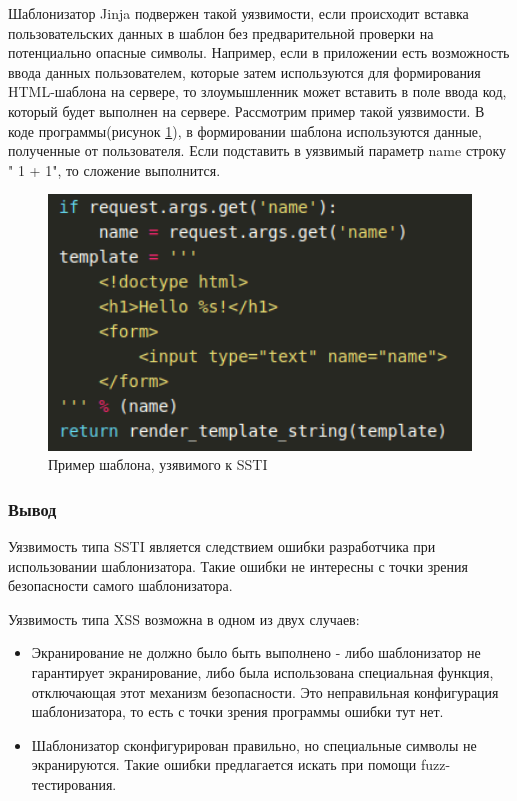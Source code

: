 \documentclass[a4paper]{article}
\begin{document}
Шаблонизатор Jinja подвержен такой уязвимости, если происходит вставка пользовательских данных в шаблон без предварительной проверки на потенциально опасные символы. Например, если в приложении есть возможность ввода данных пользователем, которые затем используются для формирования HTML-шаблона на сервере, то злоумышленник может вставить в поле ввода код, который будет выполнен на сервере. Рассмотрим пример такой уязвимости. В коде программы(рисунок \ref{SSTIJinja}), в формировании шаблона используются данные, полученные от пользователя. Если подставить в уязвимый параметр name строку "{{ 1 + 1}}", то сложение выполнится. 

\begin{figure}[ht!]
    \includegraphics[width=140mm]{SSTIJinja.png}
    \caption{Пример шаблона, узявимого к SSTI}
    \label{SSTIJinja}
    \end{figure}

\subsubsection{Вывод}

Уязвимость типа SSTI является следствием ошибки разработчика при использовании шаблонизатора. Такие ошибки не интересны с точки зрения безопасности самого шаблонизатора. 

Уязвимость типа XSS возможна в одном из двух случаев:

\begin{itemize}
    \item Экранирование не должно было быть выполнено - либо шаблонизатор не гарантирует экранирование, либо была использована специальная функция, отключающая этот механизм безопасности. Это неправильная конфигурация шаблонизатора, то есть с точки зрения программы ошибки тут нет.
    \item Шаблонизатор сконфигурирован правильно, но специальные символы не экранируются. Такие ошибки предлагается искать при помощи fuzz-тестирования.
\end{itemize}
\end{document}
